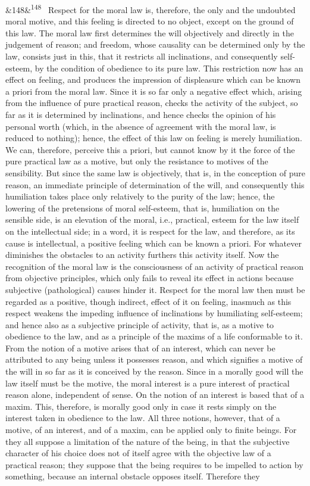 \documentclass[12pt]{article}
\newcommand{\para}[1][]{\par\noindent\ifx&#1&\else\textsuperscript{\footnotesize #1}~\fi}
\begin{document}
\para[148] Respect for the moral law is, therefore, the only and the undoubted moral motive, and this feeling is directed to no object, except on the ground of this law. The moral law first determines the will objectively and directly in the judgement of reason; and freedom, whose causality can be determined only by the law, consists just in this, that it restricts all inclinations, and consequently self-esteem, by the condition of obedience to its pure law. This restriction now has an effect on feeling, and produces the impression of displeasure which can be known a priori from the moral law. Since it is so far only a negative effect which, arising from the influence of pure practical reason, checks the activity of the subject, so far as it is determined by inclinations, and hence checks the opinion of his personal worth (which, in the absence of agreement with the moral law, is reduced to nothing); hence, the effect of this law on feeling is merely humiliation. We can, therefore, perceive this a priori, but cannot know by it the force of the pure practical law as a motive, but only the resistance to motives of the sensibility. But since the same law is objectively, that is, in the conception of pure reason, an immediate principle of determination of the will, and consequently this humiliation takes place only relatively to the purity of the law; hence, the lowering of the pretensions of moral self-esteem, that is, humiliation on the sensible side, is an elevation of the moral, i.e., practical, esteem for the law itself on the intellectual side; in a word, it is respect for the law, and therefore, as its cause is intellectual, a positive feeling which can be known a priori. For whatever diminishes the obstacles to an activity furthers this activity itself. Now the recognition of the moral law is the consciousness of an activity of practical reason from objective principles, which only fails to reveal its effect in actions because subjective (pathological) causes hinder it. Respect for the moral law then must be regarded as a positive, though indirect, effect of it on feeling, inasmuch as this respect weakens the impeding influence of inclinations by humiliating self-esteem; and hence also as a subjective principle of activity, that is, as a motive to obedience to the law, and as a principle of the maxims of a life conformable to it. From the notion of a motive arises that of an interest, which can never be attributed to any being unless it possesses reason, and which signifies a motive of the will in so far as it is conceived by the reason. Since in a morally good will the law itself must be the motive, the moral interest is a pure interest of practical reason alone, independent of sense. On the notion of an interest is based that of a maxim. This, therefore, is morally good only in case it rests simply on the interest taken in obedience to the law. All three notions, however, that of a motive, of an interest, and of a maxim, can be applied only to finite beings. For they all suppose a limitation of the nature of the being, in that the subjective character of his choice does not of itself agree with the objective law of a practical reason; they suppose that the being requires to be impelled to action by something, because an internal obstacle opposes itself. Therefore they 
\end{document}
